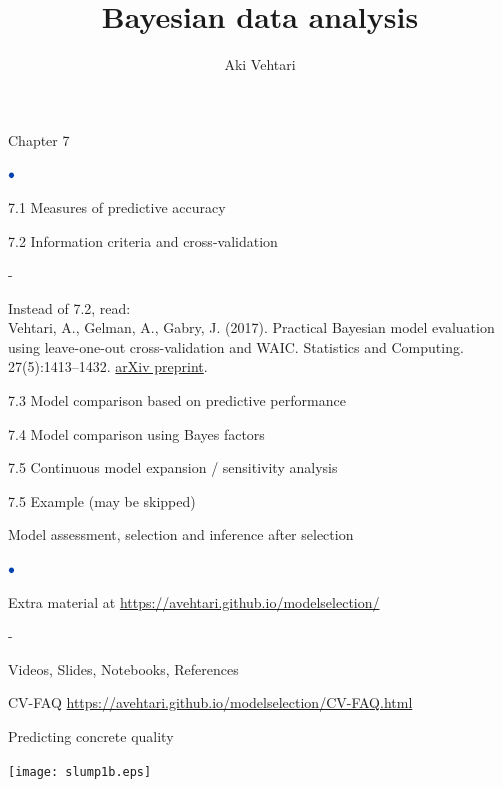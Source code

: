 \documentclass[english,t]{beamer}
\title[]{Bayesian data analysis}
\subtitle{}
\author{Aki Vehtari}
\institute[Aalto]{}
\date[]{}
\newenvironment{list1}{
   \begin{list}{$\color{list1}\bullet$}{\itemsep=6pt}}{
  \end{list}}
\newenvironment{list2}{
  \begin{list}{-}{\baselineskip=12pt\itemsep=2pt}}{
  \end{list}}
\begin{document}
\begin{frame}{Chapter 7}

   \begin{list1}
   \item 7.1 Measures of predictive accuracy
   \item {\color{gray} 7.2 Information criteria and cross-validation}
     \begin{list2}
     \item Instead of 7.2, read:\\
       Vehtari, A., Gelman, A., Gabry, J. (2017). Practical Bayesian
       model evaluation using leave-one-out cross-validation and
       WAIC. Statistics and Computing. 27(5):1413–1432.
       \href{http://arxiv.org/abs/1507.04544}{arXiv preprint}.
     \end{list2}
   \item 7.3 Model comparison based on predictive performance
   \item 7.4 Model comparison using Bayes factors
   \item 7.5 Continuous model expansion / sensitivity analysis
   \item {\color{gray}7.5 Example (may be skipped)}
   \end{list1}

\end{frame}

\begin{frame}{Model assessment, selection and inference after selection}

   \begin{list1}
   \item Extra material at \url{https://avehtari.github.io/modelselection/}
     \begin{list2}
       \item Videos, Slides, Notebooks, References
     \end{list2}
       \item CV-FAQ \url{https://avehtari.github.io/modelselection/CV-FAQ.html}
   \end{list1}

\end{frame}
 
\begin{frame}{Predicting concrete quality}

  \begin{center}
    \texttt{[image: slump1b.eps]}
  \end{center}
  
\end{frame}
\end{document}
